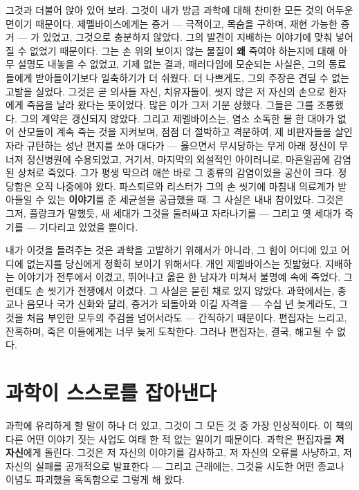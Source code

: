 그것과 더불어 앉아 있어 보라. 그것이 내가 방금 과학에 대해 찬미한 모든 것의 어두운 면이기 때문이다. 제멜바이스에게는 증거 — 극적이고, 목숨을 구하며, 재현 가능한 증거 — 가 있었고, 그것으로 충분하지 않았다. 그의 발견이 지배하는 이야기에 맞춰 넣어질 수 없었기 때문이다. 그는 손 위의 보이지 않는 물질이 \textbf{왜} 죽여야 하는지에 대해 아무 설명도 내놓을 수 없었고, 기제 없는 결과, 패러다임에 모순되는 사실은, 그의 동료들에게 받아들이기보다 일축하기가 더 쉬웠다. 더 나쁘게도, 그의 주장은 견딜 수 없는 고발을 실었다. 그것은 곧 의사들 자신, 치유자들이, 씻지 않은 저 자신의 손으로 환자에게 죽음을 날라 왔다는 뜻이었다. 많은 이가 그저 기분 상했다. 그들은 그를 조롱했다. 그의 계약은 갱신되지 않았다. 그리고 제멜바이스는, 염소 소독한 물 한 대야가 없어 산모들이 계속 죽는 것을 지켜보며, 점점 더 절박하고 격분하여, 제 비판자들을 살인자라 규탄하는 성난 편지를 쏘아 대다가 — 옳으면서 무시당하는 무게 아래 정신이 무너져 정신병원에 수용되었고, 거기서, 마지막의 외설적인 아이러니로, 마흔일곱에 감염된 상처로 죽었다. 그가 평생 막으려 애쓴 바로 그 종류의 감염이었을 공산이 크다. 정당함은 오직 나중에야 왔다. 파스퇴르와 리스터가 그의 손 씻기에 마침내 의료계가 받아들일 수 있는 \textbf{이야기}를 준 세균설을 공급했을 때. 그 사실은 내내 참이었다. 그것은 그저, 플랑크가 말했듯, 새 세대가 그것을 둘러싸고 자라나기를 — 그리고 옛 세대가 죽기를 — 기다리고 있었을 뿐이다.

내가 이것을 들려주는 것은 과학을 고발하기 위해서가 아니라, 그 힘이 어디에 있고 어디에 없는지를 당신에게 정확히 보이기 위해서다. 개인 제멜바이스는 짓밟혔다. 지배하는 이야기가 전투에서 이겼고, 뛰어나고 옳은 한 남자가 미쳐서 불명예 속에 죽었다. 그런데도 손 씻기가 전쟁에서 이겼다. 그 사실은 묻힌 채로 있지 않았다. 과학에서는, 종교나 음모나 국가 신화와 달리, 증거가 되돌아와 이길 자격을 — 수십 년 늦게라도, 그것을 처음 부인한 모두의 주검을 넘어서라도 — 간직하기 때문이다. 편집자는 느리고, 잔혹하며, 죽은 이들에게는 너무 늦게 도착한다. 그러나 편집자는, 결국, 해고될 수 없다.

\section*{과학이 스스로를 잡아낸다}

과학에 유리하게 할 말이 하나 더 있고, 그것이 그 모든 것 중 가장 인상적이다. 이 책의 다른 어떤 이야기 짓는 사업도 여태 한 적 없는 일이기 때문이다. 과학은 편집자를 \textbf{저 자신}에게 돌린다. 그것은 저 자신의 이야기를 감사하고, 저 자신의 오류를 사냥하고, 저 자신의 실패를 공개적으로 발표한다 — 그리고 근래에는, 그것을 시도한 어떤 종교나 이념도 파괴했을 혹독함으로 그렇게 해 왔다.

